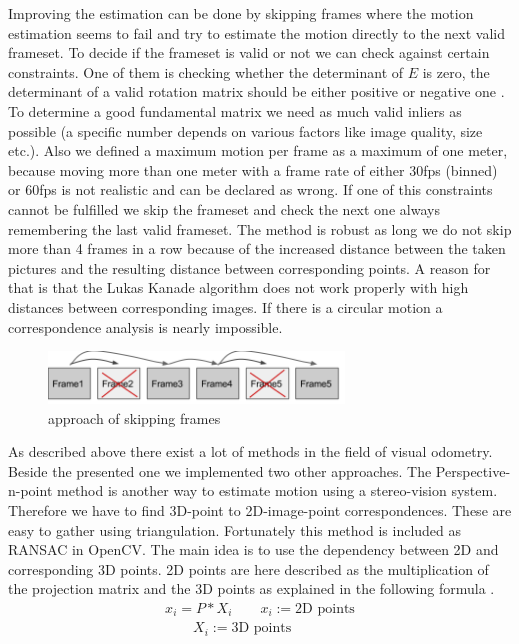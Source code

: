 \documentclass[11pt]{article}
\begin{document}
	Improving the estimation can be done by skipping frames where the motion estimation seems to fail and try to estimate the motion directly to the next valid frameset. To decide if the frameset is valid or not we can check against certain constraints. One of them is checking whether the determinant of $E$ is zero, the determinant of a valid rotation matrix should be either positive or negative one \cite{ValidEssential}. To determine a good fundamental matrix we need as much valid inliers as possible (a specific number depends on various factors like image quality, size etc.). Also we defined a maximum motion per frame as a maximum of one meter, because moving more than one meter with a frame rate of either 30fps (binned) or 60fps is not realistic and can be declared as wrong. If one of this constraints cannot be fulfilled we skip the frameset and check the next one always remembering the last valid frameset. The method is robust as long we do not skip more than 4 frames in a row because of the increased distance between the taken pictures and the resulting distance between corresponding points. A reason for that is that the Lukas Kanade \cite{Lucas_Kanade} algorithm does not work properly with high distances between corresponding images. If there is a circular motion a correspondence analysis is nearly impossible. 

	\begin{figure}[H]
		\centering
		\includegraphics[width=0.7\textwidth]{images/skipFrames.png}
		\caption{approach of skipping frames}
	\end{figure}
	
	As described above there exist a lot of methods in the field of visual odometry. Beside the presented one we implemented two other approaches.
	The Perspective-n-point method is another way to estimate motion using a stereo-vision system. Therefore we have to find 3D-point to 2D-image-point correspondences. These are easy to gather using triangulation. Fortunately this method is included as RANSAC in OpenCV. The main idea is to use the dependency between 2D and corresponding 3D points. 2D points are here described as the multiplication of the projection matrix and the 3D points as explained in the following formula \cite{PnP}.
	\begin{align}
	  x_i = P * X_i \qquad x_i := \text{2D points} \\
	  \qquad X_i := \text{3D points} \nonumber
	\end{align}
	
\end{document}
